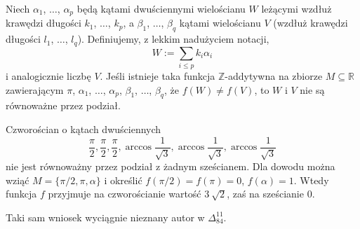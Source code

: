 \begin{theorem}[Hadwigera] %
    Niech $\alpha_1$, $\ldots$, $\alpha_p$ będą kątami dwuściennymi wielościanu $W$ leżącymi wzdłuż krawędzi długości $k_1$, $\ldots$, $k_p$, a $\beta_1$, $\ldots$, $\beta_q$ kątami wielościanu $V$ (wzdłuż krawędzi długości $l_1$, $\ldots$, $l_q$).
    Definiujemy, z lekkim nadużyciem notacji,
    \begin{equation}
        W := \sum_{i \le p} k_i \alpha_i
    \end{equation}
    i analogicznie liczbę $V$.
    Jeśli istnieje taka funkcja $\mathbb Z$-addytywna na zbiorze $M \subseteq \mathbb R$ zawierającym $\pi$, $\alpha_1$, $\ldots$, $\alpha_p$, $\beta_1$, $\ldots$, $\beta_q$, że $f(W) \neq f(V)$, to $W$ i $V$ nie są równoważne przez podział.
\end{theorem}

\begin{corollary}
    Czworościan o kątach dwuściennych
    \begin{equation}
        \frac \pi 2, \frac \pi 2, \frac \pi 2,
        \arccos \frac{1}{\sqrt 3}, \arccos \frac{1}{\sqrt 3}, \arccos \frac{1}{\sqrt 3}
    \end{equation}
    nie jest równoważny przez podział z żadnym sześcianem.
    Dla dowodu można wziąć $M = \{\pi/2, \pi, \alpha\}$ i określić $f(\pi/2) = f(\pi) = 0$, $f(\alpha) = 1$.
    Wtedy funkcja $f$ przyjmuje na czworościanie wartość $3 \ \sqrt 2$, zaś na sześcianie $0$.
\end{corollary}

Taki sam wniosek wyciągnie nieznany autor w $\Delta_{84}^{11}$.


